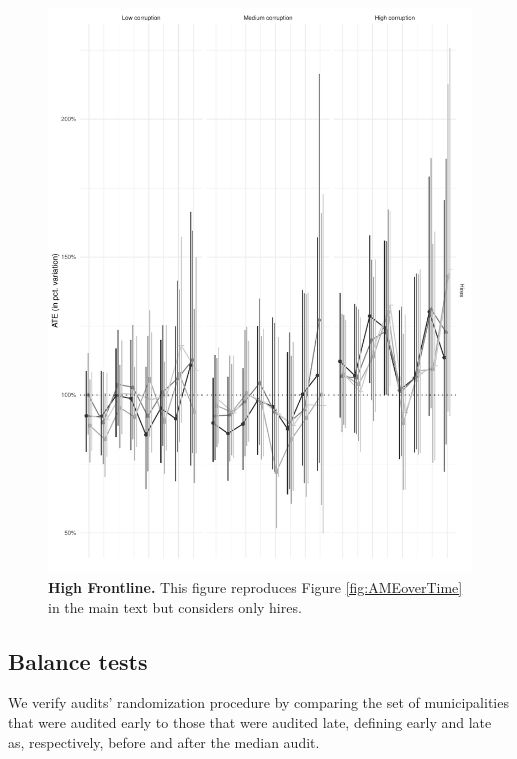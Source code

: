\documentclass[12pt,a4paper]{article}
\theoremstyle{definition}
\begin{document}
{\begin{figure}[H]
    \centering
    \includegraphics{figures/AMEoverTimeHires.pdf}
    \caption{{\bf High Frontline.} This figure reproduces Figure \ref{fig:AMEoverTime} in the main text but considers only hires.}
    \label{fig:AMEoverTimeHires}
\end{figure}

\subsection{Balance tests}
\label{app:balanceRobustness}

We verify audits' randomization procedure by comparing the set of municipalities that were audited early to those that were audited late, defining early and late as, respectively, before and after the median audit. 

}
\end{document}
